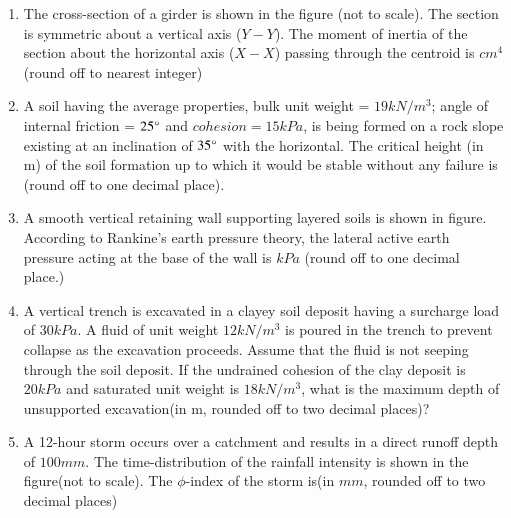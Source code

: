 \documentclass[journal]{IEEEtran}
\begin{document}
\begin{enumerate}
	\begin{figure}[H]
    		\centering
    		
    		\caption{}
    		\label{36}
	\end{figure}
	\item 
	The cross-section of a girder is shown in the figure (not to scale). The section is symmetric about a vertical axis ($Y-Y$). The moment of inertia of the section about the horizontal axis ($X-X$) passing through the centroid is $cm^{4}$ (round off to nearest integer)
	\begin{figure}[H]
    		\centering
    		
    		\caption{}
    		\label{36}
	\end{figure}
	\item
	A soil having the average properties, bulk unit weight = $19 kN/m^{3}$; angle of internal friction = $25 \degree $ and $cohesion = 15 kPa$, is being formed on a rock slope existing at an inclination of $35 \degree $ with the horizontal. The critical height (in m) of the soil formation up to which it would be stable without any failure is (round off to one decimal place).
	\\
	\item
	A smooth vertical retaining wall supporting layered soils is shown in figure. According to Rankine's earth pressure theory, the lateral active earth pressure acting at the base of the wall is $kPa$ (round off to one decimal place.)
	\begin{figure}[H]
    		\centering
    		
    		\caption{}
    		\label{36}
	\end{figure}
	\item
	A vertical trench is excavated in a clayey soil deposit having a surcharge load of $30 kPa$. A fluid of unit weight $12 kN/m^{3}$ is poured in the trench to prevent collapse as the excavation proceeds. Assume that the fluid is not seeping through the soil deposit. If the undrained cohesion of the clay deposit is $20 kPa$ and saturated unit weight is $18 kN/m^{3}$, what is the maximum depth of unsupported excavation(in m, rounded off to two decimal places)?
	\item
	A 12-hour storm occurs over a catchment and results in a direct runoff depth of $100 mm$. The time-distribution of the rainfall intensity is shown in the figure(not to scale). The $\phi$-index of the storm is(in $mm$, rounded off to two decimal places)
	\begin{figure}[H]

\end{figure}
\end{enumerate}
\end{document}
